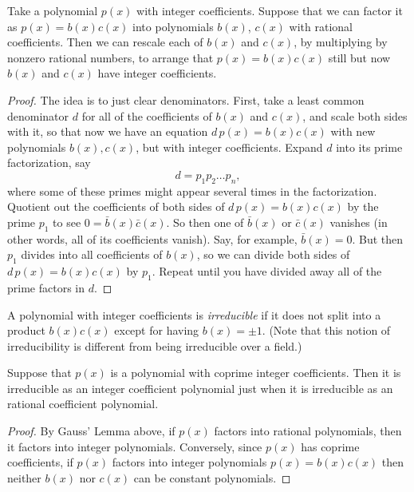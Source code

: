 \begin{lemma}
Take a polynomial \(p(x)\) with integer coefficients.
Suppose that we can factor it as \(p(x)=b(x)c(x)\) into polynomials \(b(x)\), \(c(x)\) with rational coefficients.
Then we can rescale each of \(b(x)\) and \(c(x)\), by multiplying by nonzero rational numbers, to arrange that \(p(x)=b(x)c(x)\) still but now \(b(x)\) and \(c(x)\) have integer coefficients.
\end{lemma}
\begin{proof}
The idea is to just clear denominators.
First, take a least common denominator \(d\) for all of the coefficients of \(b(x)\) and \(c(x)\), and scale both sides with it, so that now we have an equation \(d \, p(x)=b(x)c(x)\) with new polynomials \(b(x), c(x)\), but with integer coefficients.
Expand \(d\) into its prime factorization, say
\[
d=p_1 p_2 \dots p_n, 
\]
where some of these primes might appear several times in the factorization.
Quotient out the coefficients of both sides of \(d \, p(x)=b(x)c(x)\) by the prime \(p_1\) to see \(0=\bar{b}(x)\bar{c}(x)\).
So then one of \(\bar{b}(x)\) or \(\bar{c}(x)\) vanishes (in other words, all of its coefficients vanish).
Say, for example, \(\bar{b}(x)=0\).
But then \(p_1\) divides into all coefficients of \(b(x)\), so we can divide both sides of \(d \, p(x)=b(x)c(x)\) by \(p_1\).
Repeat until you have divided away all of the prime factors in \(d\).
\end{proof}

A polynomial with integer coefficients is \emph{irreducible}%
%
% 
%
if it does not split into a product \(b(x)c(x)\) except for having \(b(x)=\pm 1\).
(Note that this notion of irreducibility is different from being irreducible over a field.)

\begin{corollary}\label{corollary:coprime.coeffs}
Suppose that \(p(x)\) is a polynomial with coprime integer coefficients.
Then it is irreducible as an integer coefficient polynomial just when it is irreducible as an rational coefficient polynomial.
\end{corollary}
\begin{proof}
By Gauss' Lemma above, if \(p(x)\) factors into rational polynomials, then it factors into integer polynomials.
Conversely, since \(p(x)\) has coprime coefficients, if \(p(x)\) factors into integer polynomials \(p(x) = b(x)c(x)\) then neither \(b(x)\) nor \(c(x)\) can be constant polynomials. 
\end{proof}

